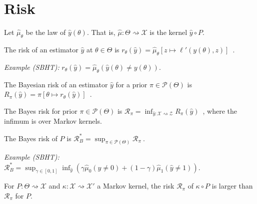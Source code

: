 \section{Risk}

Let $\hat{\mu}_\theta$ be the law of $\hat{y}(\theta)$. That is, $\hat{\mu} : \mathcal \Theta \rightsquigarrow \mathcal X$ is the kernel $\hat{y} \circ P$.

\begin{definition}[Risk]
  \label{def:risk}
  \leanok
  The risk of an estimator $\hat{y}$ at $\theta \in \Theta$ is $r_\theta(\hat{y}) = \hat{\mu}_\theta\left[z \mapsto \ell'(y(\theta), z)\right]$~.
\end{definition}

\emph{Example (SBHT):} $r_\theta(\hat{y}) = \hat{\mu}_\theta(\hat{y}(\theta) \ne y(\theta))$.


\begin{definition}
  \label{def:bayesianRisk}
  \leanok
  The Bayesian risk of an estimator $\hat{y}$ for a prior $\pi \in \mathcal P(\Theta)$ is $R_\pi(\hat{y}) = \pi\left[\theta \mapsto r_\theta(\hat{y})\right]$~.
\end{definition}


\begin{definition}
  \label{def:bayesRisk}
  \leanok
  The Bayes risk for prior $\pi \in \mathcal P(\Theta)$ is $\mathcal R_\pi = \inf_{\hat{y} : \mathcal X \rightsquigarrow \mathcal Z} R_\pi(\hat{y})$~, where the infimum is over Markov kernels.

  The Bayes risk of $P$ is $\mathcal R^*_B = \sup_{\pi \in \mathcal P(\Theta)} \mathcal R_\pi \: .$
\end{definition}

\emph{Example (SBHT):} $\mathcal R^*_B = \sup_{\gamma \in [0,1]}\inf_{\hat{y}}\left(\gamma \hat{\mu}_0(\hat{y} \ne 0) + (1 - \gamma) \hat{\mu}_1(\hat{y} \ne 1)\right)$.

\begin{theorem}
  \label{thm:data_proc_bayesRisk}
  \leanok
  For $P : \Theta \rightsquigarrow \mathcal X$ and $\kappa : \mathcal X \rightsquigarrow \mathcal X'$ a Markov kernel, the risk $\mathcal R_\pi$ of $\kappa \circ P$ is larger than $\mathcal R_\pi$ for $P$.
\end{theorem}


